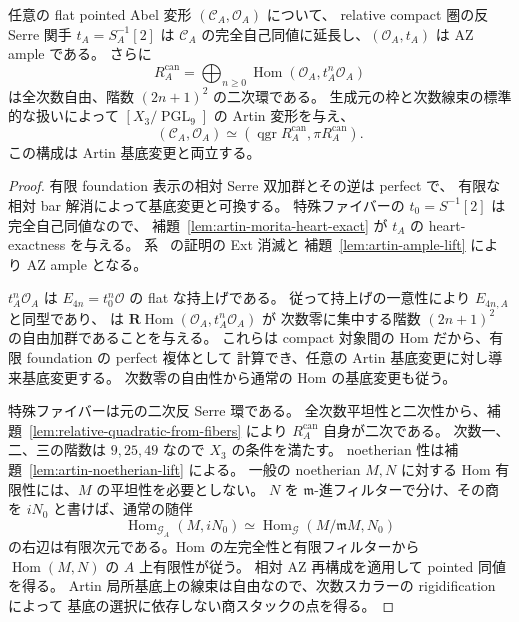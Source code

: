 \begin{proposition}
\label{prop:artin-canonical-antiserre}
任意の flat pointed Abel 変形 $(\mathcal C_A,\mathcal O_A)$ について、
relative compact 圏の反 Serre 関手 $t_A=S_A^{-1}[2]$ は
$\mathcal C_A$ の完全自己同値に延長し、$(\mathcal O_A,t_A)$ は AZ ample である。
さらに
\[
 R_A^{\mathrm{can}}
 =\bigoplus_{n\ge0}\operatorname{Hom}(\mathcal O_A,t_A^n\mathcal O_A)
\]
は全次数自由、階数 $(2n+1)^2$ の二次環である。
生成元の枠と次数線束の標準的な扱いによって $[X_3/\operatorname{PGL}_9]$ の
Artin 変形を与え、
\[
 (\mathcal C_A,\mathcal O_A)
 \simeq(\operatorname{qgr}R_A^{\mathrm{can}},\pi R_A^{\mathrm{can}}).
\]
この構成は Artin 基底変更と両立する。
\end{proposition}
\begin{proof}
有限 foundation 表示の相対 Serre 双加群とその逆は perfect で、
有限な相対 bar 解消によって基底変更と可換する。
特殊ファイバーの $t_0=S^{-1}[2]$ は完全自己同値なので、
補題~\ref{lem:artin-morita-heart-exact} が $t_A$ の heart-exactness を与える。
系~\cite[\texttt{cor:pointed-derived-exact}]{QuadricIntrinsic2026} の証明の Ext 消滅と
補題~\ref{lem:artin-ample-lift} により AZ ample となる。

$t_A^n\mathcal O_A$ は $E_{4n}=t_0^n\mathcal O$ の flat な持上げである。
従って持上げの一意性により $E_{4n,A}$ と同型であり、
\cite[Theorem 5.13(4)]{DeDekenLowen2011} は
$\mathbf R\operatorname{Hom}(\mathcal O_A,t_A^n\mathcal O_A)$ が
次数零に集中する階数 $(2n+1)^2$ の自由加群であることを与える。
これらは compact 対象間の Hom だから、有限 foundation の perfect 複体として
計算でき、任意の Artin 基底変更に対し導来基底変更する。
次数零の自由性から通常の Hom の基底変更も従う。

特殊ファイバーは元の二次反 Serre 環である。
全次数平坦性と二次性から、補題~\ref{lem:relative-quadratic-from-fibers} により
$R_A^{\mathrm{can}}$ 自身が二次である。
次数一、二、三の階数は $9,25,49$ なので $X_3$ の条件を満たす。
noetherian 性は補題~\ref{lem:artin-noetherian-lift} による。
一般の noetherian $M,N$ に対する Hom 有限性には、$M$ の平坦性を必要としない。
$N$ を $\mathfrak m$-進フィルターで分け、その商を $iN_0$ と書けば、通常の随伴
\[
 \operatorname{Hom}_{\mathcal G_A}(M,iN_0)
 \simeq\operatorname{Hom}_{\mathcal G}(M/\mathfrak mM,N_0)
\]
の右辺は有限次元である。Hom の左完全性と有限フィルターから
$\operatorname{Hom}(M,N)$ の $A$ 上有限性が従う。
相対 AZ 再構成を適用して pointed 同値を得る。
Artin 局所基底上の線束は自由なので、次数スカラーの rigidification によって
基底の選択に依存しない商スタックの点を得る。
\end{proof}

